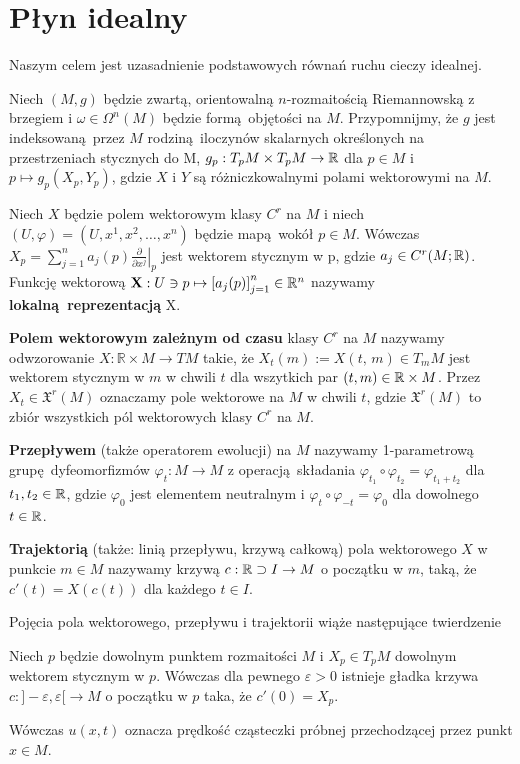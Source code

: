 \chapter{Płyn idealny} Naszym celem jest uzasadnienie podstawowych równań ruchu cieczy idealnej. 

Niech \((M, g)\) będzie zwartą, orientowalną \(n\)-rozmaitością Riemannowską z brzegiem i \(\omega \in \Omega^n(M)\) będzie formą objętości na \(M\). Przypomnijmy, że \(g\) jest indeksowaną przez \(M\) rodziną iloczynów skalarnych określonych na przestrzeniach stycznych do M, \(g_p: T_p M \times T_p M \rightarrow \mathbb{R}\) dla \(p\in M\) i \(p\mapsto g_p(X_p, Y_p)\), gdzie \(X\) i \(Y\) są różniczkowalnymi polami wektorowymi na \(M\).

Niech \(X\) będzie polem wektorowym klasy \(C^r\) na \(M\) i niech \((U, \varphi) = (U, x^1, x^2, \dots, x^n)\) będzie mapą wokół \(p\in M\). Wówczas \(X_p = \sum_{j=1}^{n}a_j(p)\left.\frac{\partial}{\partial x^j}\right|_p\) jest wektorem stycznym w p, gdzie \(a_j\in C^r(M; \mathbb{R})\). Funkcję wektorową \(\mathbf{X}: U\ni p \mapsto \left[a_j(p)\right]_{j=1}^n\in \mathbb{R}^n\) nazywamy \textbf{lokalną reprezentacją} X.

\textbf{Polem wektorowym zależnym od czasu} klasy \(C^r\) na \(M\) nazywamy odwzorowanie \(X:\mathbb{R}\times M\rightarrow TM\) takie, że \(X_t(m):=X(t,\,m) \in T_{m} M\) jest wektorem stycznym w \(m\) w chwili \(t\) dla wszytkich par \((t, m) \in \mathbb{R} \times M\). Przez \(X_t\in \mathfrak{X}^r(M)\) oznaczamy pole wektorowe na \(M\) w chwili \(t\), gdzie \(\mathfrak{X}^r(M)\) to zbiór wszystkich pól wektorowych klasy \(C^r\) na \(M\). 

\textbf{Przepływem} (także operatorem ewolucji) na \(M\) nazywamy 1-parametrową grupę dyfeomorfizmów \(\varphi_t: M \rightarrow M\) z operacją składania \(\varphi_{t_1}\circ\varphi_{t_2} = \varphi_{t_1 + t_2}\) dla \(t_{1}, {t}_2 \in \mathbb{R}\), gdzie \(\varphi_0\) jest elementem neutralnym i \(\varphi_{t}\circ\varphi_{-t} = \varphi_0\) dla dowolnego \(t\in\mathbb{R}\).  

\textbf{Trajektorią} (także: linią przepływu, krzywą całkową) pola wektorowego \(X\) w punkcie \(m\in M\) nazywamy krzywą \(c: \mathbb{R} \supset I \rightarrow M\) o początku w \(m\), taką, że \(c'(t) = X(c(t))\) dla każdego \(t\in I\).

Pojęcia pola wektorowego, przepływu i trajektorii wiąże następujące twierdzenie

\begin{twierdzenie}
    Niech \(p\) będzie dowolnym punktem rozmaitości \(M\) i \(X_p\in T_p M\) dowolnym wektorem stycznym w \(p\). Wówczas dla pewnego \(\varepsilon > 0\) istnieje gładka krzywa \(c: ]-\varepsilon, \varepsilon[ \rightarrow M\) o początku w \(p\) taka, że \(c'(0) = X_p\).
\end{twierdzenie}

Wówczas \(u(x, t)\) oznacza prędkość cząsteczki próbnej przechodzącej przez punkt \(x\in M\). 
